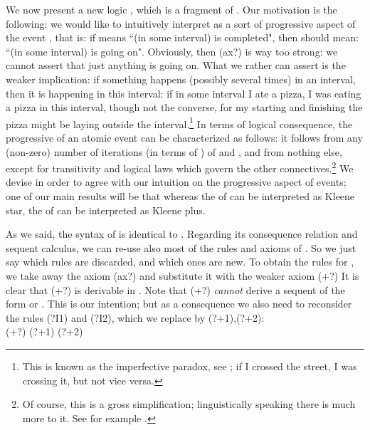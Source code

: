 \documentclass{eptcs}
\begin{document}
We now present a new logic , which is a fragment of .
Our motivation is the following: we would like to intuitively interpret 
 as a sort of progressive aspect of the event
, that is: if  means ``(in some interval)  is completed",
then  should mean: ``(in some interval)  
is going on". Obviously, then (ax?) is way too strong: we
cannot assert that just anything is going on. What we rather can assert
is the weaker implication: if something happens (possibly several times)
in an interval, then it is happening in this interval:
if in some interval I ate a pizza, I was eating a pizza in this interval,
though not the converse, for my starting and finishing
the pizza might be laying outside the interval.\footnote{This is known as 
the imperfective paradox, 
see \cite{moenssteedman:ontology}; if I crossed the street, I was
crossing it, but not vice versa.} In terms of logical consequence, 
the progressive  of an atomic
event  can be characterized as follows: it follows from any
(non-zero) number of iterations (in terms of ) 
of  and , 
and from nothing else, except for transitivity and logical laws which govern the
other connectives.\footnote{Of course, this is a gross
simplification; linguistically speaking there is much more to it.
See for example \cite{galton:aspect}.}
We devise  in order
to agree with our intuition on the progressive aspect of events;
one of our main results will be that whereas the  of  can be
interpreted as Kleene star, the  of  can be interpreted
as Kleene plus.

As we said, the syntax of  is identical to . 
Regarding its consequence relation and sequent calculus, we
can re-use also most of the rules and axioms of . So we just
say which rules are discarded, and which ones are new.
To obtain the rules for , we take away 
the axiom (ax?)
and substitute it with the weaker axiom  (+?)
It is clear that (+?) is derivable in .
Note that (+?) \textit{cannot} derive a sequent of the form
 or
. This is our intention; but as a consequence
we also need to reconsider the rules (?I1) and (?I2), which we 
replace by (?+1),(?+2): 
\\

(+?) 
 (?+1) 
 (?+2) 
\\
\end{document}

